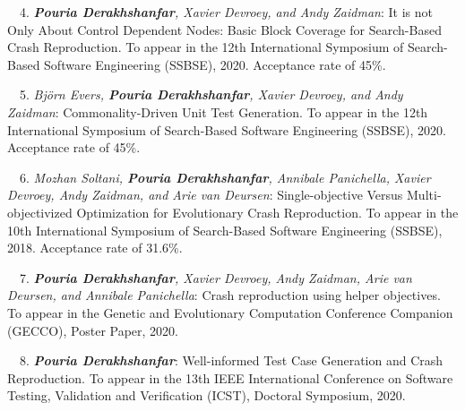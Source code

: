 \begin{etaremune}{\small
    \item[\faFileTextO~\faTrophy~4.] \emph{\textbf{Pouria Derakhshanfar}, Xavier Devroey, and Andy Zaidman}: 
        It is not Only About Control Dependent Nodes: Basic Block Coverage for Search-Based Crash Reproduction.
        To appear in the 12th International Symposium of Search-Based Software Engineering (SSBSE),
        2020. Acceptance rate of 45\%.
}\end{etaremune}


\begin{etaremune}{\small
    \item[\faFileTextO~~5.] \emph{Björn Evers, \textbf{Pouria Derakhshanfar}, Xavier Devroey, and Andy Zaidman}: 
        Commonality-Driven Unit Test Generation.
        To appear in the 12th International Symposium of Search-Based Software Engineering (SSBSE),
        2020. Acceptance rate of 45\%.
}\end{etaremune}

\begin{etaremune}{\small
    \item[~~6.] \emph{Mozhan Soltani, \textbf{Pouria Derakhshanfar}, Annibale Panichella, Xavier Devroey, Andy Zaidman, and Arie van Deursen}: 
    Single-objective Versus Multi-objectivized Optimization for Evolutionary Crash Reproduction.
        To appear in the 10th International Symposium of Search-Based Software Engineering (SSBSE),
        2018. Acceptance rate of 31.6\%.
}\end{etaremune}

\begin{etaremune}{\small
    \item[~~7.] \emph{\textbf{Pouria Derakhshanfar}, Xavier Devroey,  Andy Zaidman, Arie van Deursen, and Annibale Panichella}: 
        Crash reproduction using helper objectives.
        To appear in the  Genetic and Evolutionary Computation Conference Companion (GECCO), Poster Paper,
        2020.
}\end{etaremune}

\begin{etaremune}{\small
    \item[\faFileTextO~~8.] \emph{\textbf{Pouria Derakhshanfar}}: 
        Well-informed Test Case Generation and Crash Reproduction.
        To appear in the 13th IEEE International Conference on Software Testing, Validation and Verification (ICST), Doctoral Symposium,
        2020.
}\end{etaremune}

